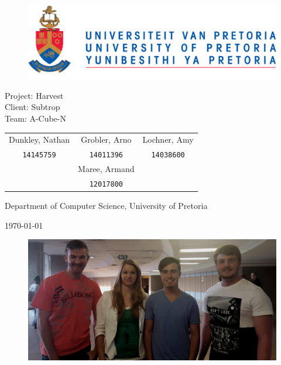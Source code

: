 \documentclass[english]{article}
\date{\today}
\begin{document}
	
	\begin{titlepage}
		\begin{figure}[!t]
			\includegraphics[width=\linewidth]{up_logo.png}
		\end{figure}
		\begin{center}
			\huge{Project: Harvest}\\
			\large{Client: Subtrop}\\
			\vspace{10mm}
			\huge{Team: A-Cube-N}\\
		\end{center}
		\begin{center}
			\begin{tabular}{ c c c }
				Dunkley, Nathan & Grobler, Arno & Lochner, Amy \\
				\texttt{14145759} & \texttt{14011396} & \texttt{14038600}\\
				& Maree, Armand &\\
				& \texttt{12017800} &
			\end{tabular}
		\end{center}
		\begin{center}
			Department of Computer Science, University of Pretoria
		\end{center}
		\begin{center}
			\today
			\begin{figure}[!h]
				\includegraphics[width=\linewidth]{team.jpg}
			\end{figure}
		\end{center}
	\end{titlepage}
	\newpage
	\tableofcontents
	\newpage
\end{document}
